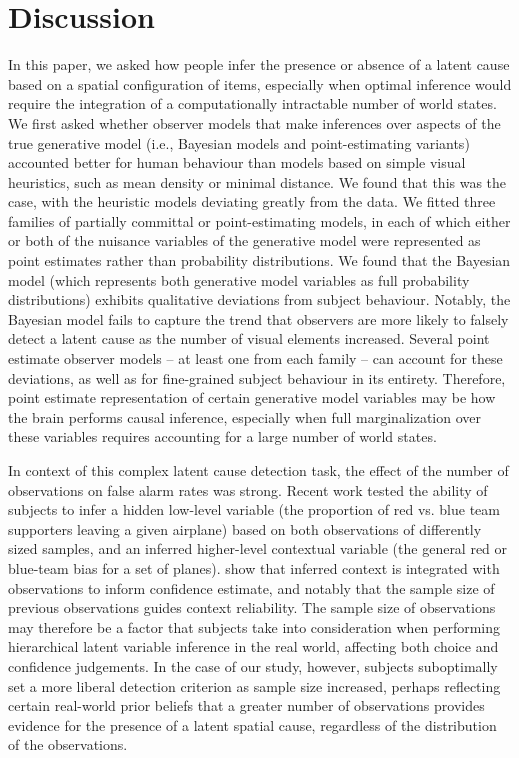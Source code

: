 \documentclass{article}
\begin{document}
\section*{Discussion}
In this paper, we asked how people infer the presence or absence of a latent cause based on a spatial configuration of items, especially when optimal inference would require the integration of a computationally intractable number of world states. We first asked whether observer models that make inferences over aspects of the true generative model (i.e., Bayesian models and point-estimating variants) accounted better for human behaviour than models based on simple visual heuristics, such as  mean density  or  minimal distance. We found that this was the case, with the heuristic models deviating greatly from the data. We  fitted three families of partially committal or point-estimating models, in each of which either or both of the  nuisance variables of the generative model were represented as point estimates rather than probability distributions. We found that the Bayesian model (which represents both generative model variables as full probability distributions) exhibits qualitative deviations from subject behaviour. Notably, the Bayesian model fails to capture the trend that observers are more likely to falsely detect a latent cause as the number of visual elements increased. Several point estimate observer models -- at least one from each family -- can account for these deviations, as well as for fine-grained subject behaviour in its entirety. Therefore, point estimate representation of certain generative model variables may be how the brain performs causal inference, especially when full marginalization over these variables requires accounting for a large number of world states.

In context of this complex latent cause detection task, the effect of the number of observations on false alarm rates was strong. Recent work tested the ability of subjects to infer a hidden low-level variable (the proportion of red vs. blue team supporters leaving a given airplane) based on both observations of differently sized samples, and an inferred higher-level contextual variable (the general red or blue-team bias for a set of planes).  \cite{schustek2019human} show that inferred context is integrated with observations to inform confidence estimate, and notably that the sample size of previous observations guides context reliability. The sample size of observations may therefore be a factor that subjects take into consideration when performing hierarchical latent variable inference in the real world, affecting both choice and confidence judgements. In the case of our study, however, subjects suboptimally set a more liberal detection criterion as sample size increased, perhaps reflecting certain real-world prior beliefs that a greater number of observations provides evidence for the presence of a latent spatial cause, regardless of the distribution of the observations.
\end{document}
